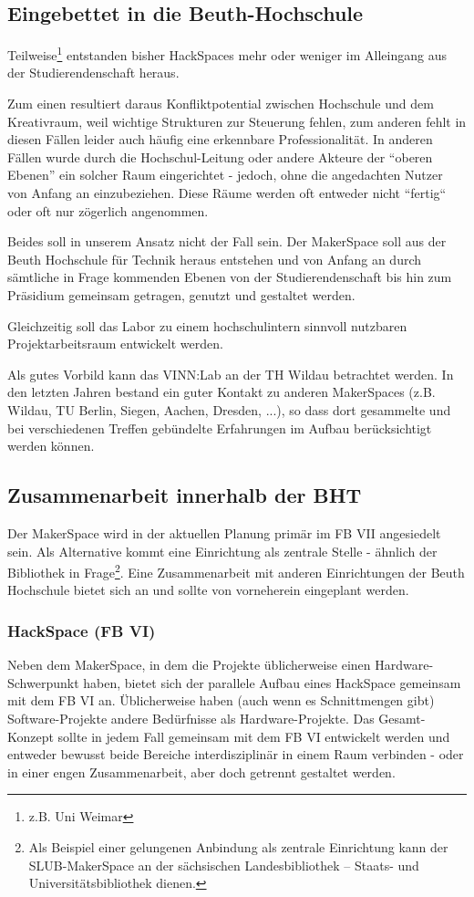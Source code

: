 \documentclass[parskip=half,headsepline,footsepline,titlepage]{scrartcl}
\begin{document}
\subsection{Eingebettet in die Beuth-Hochschule}
Teilweise\footnote{z.B. Uni Weimar} entstanden bisher HackSpaces mehr oder weniger im Alleingang aus der Studierendenschaft heraus. 

Zum einen resultiert daraus Konfliktpotential zwischen Hochschule und dem Kreativraum, weil wichtige Strukturen zur Steuerung fehlen, zum anderen fehlt in diesen Fällen leider auch häufig eine erkennbare Professionalität.
In anderen Fällen wurde durch die Hochschul-Leitung oder andere Akteure der ``oberen Ebenen'' ein solcher Raum eingerichtet - jedoch, ohne die angedachten Nutzer von Anfang an einzubeziehen. Diese Räume werden oft entweder nicht ``fertig`` oder oft nur zögerlich angenommen.

Beides soll in unserem Ansatz nicht der Fall sein. Der MakerSpace soll aus der Beuth Hochschule für Technik heraus entstehen und von Anfang an durch sämtliche in Frage kommenden Ebenen von der Studierendenschaft bis hin zum Präsidium gemeinsam getragen, genutzt und gestaltet werden.

Gleichzeitig soll das Labor zu einem hochschulintern sinnvoll nutzbaren Projektarbeitsraum entwickelt werden.

Als gutes Vorbild kann das VINN:Lab an der TH Wildau betrachtet werden. In den letzten Jahren bestand ein guter Kontakt zu anderen MakerSpaces (z.B. Wildau, TU Berlin, Siegen, Aachen, Dresden, ...), so dass dort gesammelte und bei verschiedenen Treffen gebündelte Erfahrungen im Aufbau berücksichtigt werden können.


\subsection{Zusammenarbeit innerhalb der BHT}

Der MakerSpace wird in der aktuellen Planung primär im FB VII angesiedelt sein. Als Alternative kommt eine Einrichtung als zentrale Stelle - ähnlich der Bibliothek in Frage\footnote{Als Beispiel einer gelungenen Anbindung als zentrale Einrichtung kann der SLUB-MakerSpace an der sächsischen Landesbibliothek – Staats- und Universitätsbibliothek dienen.}. Eine Zusammenarbeit mit anderen Einrichtungen der Beuth Hochschule bietet sich an und sollte von vorneherein eingeplant werden.

\subsubsection{HackSpace (FB VI)}
Neben dem MakerSpace, in dem die Projekte üblicherweise einen Hardware-Schwerpunkt haben, bietet sich der parallele Aufbau eines HackSpace gemeinsam mit dem FB VI an. Üblicherweise haben (auch wenn es Schnittmengen gibt) Software-Projekte andere Bedürfnisse als Hardware-Projekte. Das Gesamt-Konzept sollte in jedem Fall gemeinsam mit dem FB VI entwickelt werden und entweder bewusst beide Bereiche interdisziplinär in einem Raum verbinden - oder in einer engen Zusammenarbeit, aber doch getrennt gestaltet werden.
\end{document}
